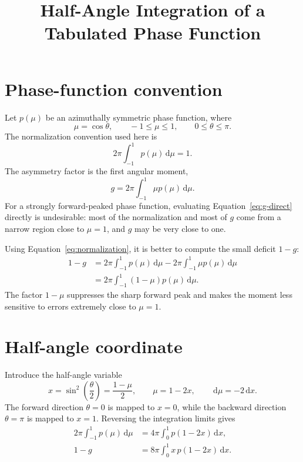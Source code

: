 \documentclass[11pt]{article}
\title{Half-Angle Integration of a Tabulated Phase Function}
\author{}
\date{}
\newcommand{\dd}{\,\mathrm{d}}
\begin{document}
\maketitle

\section{Phase-function convention}

Let $p(\mu)$ be an azimuthally symmetric phase function, where
\begin{equation}
    \mu = \cos\theta,
    \qquad -1\leq \mu\leq 1,
    \qquad 0\leq\theta\leq\pi.
\end{equation}
The normalization convention used here is
\begin{equation}
    2\pi\int_{-1}^{1}p(\mu)\dd\mu = 1.
    \label{eq:normalization}
\end{equation}
The asymmetry factor is the first angular moment,
\begin{equation}
    g = 2\pi\int_{-1}^{1}\mu p(\mu)\dd\mu.
    \label{eq:g-direct}
\end{equation}
For a strongly forward-peaked phase function, evaluating
Equation~\eqref{eq:g-direct} directly is undesirable: most of the normalization
and most of $g$ come from a narrow region close to $\mu=1$, and $g$ may be very
close to one.

Using Equation~\eqref{eq:normalization}, it is better to compute the small
deficit $1-g$:
\begin{align}
    1-g
    &=2\pi\int_{-1}^{1}p(\mu)\dd\mu
      -2\pi\int_{-1}^{1}\mu p(\mu)\dd\mu \\
    &=2\pi\int_{-1}^{1}(1-\mu)p(\mu)\dd\mu.
    \label{eq:deficit-mu}
\end{align}
The factor $1-\mu$ suppresses the sharp forward peak and makes the moment less
sensitive to errors extremely close to $\mu=1$.

\section{Half-angle coordinate}

Introduce the half-angle variable
\begin{equation}
    x=\sin^2\left(\frac{\theta}{2}\right)
     =\frac{1-\mu}{2},
    \qquad
    \mu=1-2x,
    \qquad
    \dd\mu=-2\dd x.
\end{equation}
The forward direction $\theta=0$ is mapped to $x=0$, while the backward
direction $\theta=\pi$ is mapped to $x=1$.  Reversing the integration limits
gives
\begin{align}
    2\pi\int_{-1}^{1}p(\mu)\dd\mu
        &=4\pi\int_0^1p(1-2x)\dd x, \\
    1-g
        &=8\pi\int_0^1x\,p(1-2x)\dd x.
\end{align}
\end{document}
